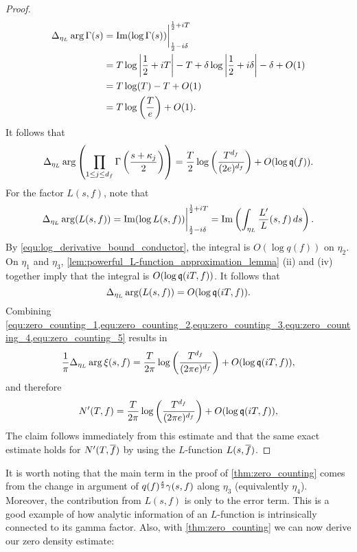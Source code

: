 \begin{proof}
\begin{align*}
        \Delta_{\eta_{L}}\arg\Gamma(s) &= \mathrm{Im}(\log\Gamma(s))\bigg|_{\frac{1}{2}-i\delta}^{\frac{1}{2}+iT} \\
        &= T\log\left|\frac{1}{2}+iT\right|-T+\delta\log\left|\frac{1}{2}+i\delta\right|-\delta+O(1) \\
        &= T\log(T)-T+O(1) \\
        &= T\log\left(\frac{T}{e}\right)+O(1).
      \end{align*}
      It follows that
      \begin{equation}\label{equ:zero_counting_4}
        \Delta_{\eta_{L}}\arg\left(\prod_{1 \le j \le d_{f}}\Gamma\left(\frac{s+\kappa_{j}}{2}\right)\right) = \frac{T}{2}\log\left(\frac{T^{d_{f}}}{(2e)^{d_{f}}}\right)+O(\log{\mathfrak{q}(f)}).
      \end{equation}
      For the factor $L(s,f)$, note that
      \[
        \Delta_{\eta_{L}}\arg(L(s,f)) = \mathrm{Im}(\log{L(s,f)})\bigg|_{\frac{1}{2}-i\delta}^{\frac{1}{2}+iT} = \mathrm{Im}\left(\int_{\eta_{L}}\frac{L'}{L}(s,f)\,ds\right).
      \]
      By \cref{equ:log_derivative_bound_conductor}, the integral is $O(\log{q(f)})$ on $\eta_{2}$. On $\eta_{1}$ and $\eta_{3}$, \cref{lem:powerful_L-function_approximation_lemma} (ii) and (iv) together imply that the integral is $O(\log{\mathfrak{q}(iT,f)})$. It follows that
      \begin{equation}\label{equ:zero_counting_5}
        \Delta_{\eta_{L}}\arg(L(s,f)) = O(\log{\mathfrak{q}(iT,f)}).
      \end{equation}
      Combining \cref{equ:zero_counting_1,equ:zero_counting_2,equ:zero_counting_3,equ:zero_counting_4,equ:zero_counting_5} results in
      \[
        \frac{1}{\pi}\Delta_{\eta_{L}}\arg\xi(s,f) = \frac{T}{2\pi}\log\left(\frac{T^{d_{f}}}{(2\pi e)^{d_{f}}}\right)+O(\log{\mathfrak{q}(iT,f)}),
      \]
      and therefore
      \[
        N'(T,f) = \frac{T}{2\pi}\log\left(\frac{T^{d_{f}}}{(2\pi e)^{d_{f}}}\right)+O(\log{\mathfrak{q}(iT,f)}),
      \]
      The claim follows immediately from this estimate and that the same exact estimate holds for $N'(T,\overline{f})$ by using the $L$-function $L(s,\overline{f})$.
    \end{proof}

    It is worth noting that the main term in the proof of \cref{thm:zero_counting} comes from the change in argument of $q(f)^{\frac{s}{2}}\gamma(s,f)$ along $\eta_{3}$ (equivalently $\eta_{4}$). Moreover, the contribution from $L(s,f)$ is only to the error term. This is a good example of how analytic information of an $L$-function is intrinsically connected to its gamma factor. Also, with \cref{thm:zero_counting} we can now derive our zero density estimate:

